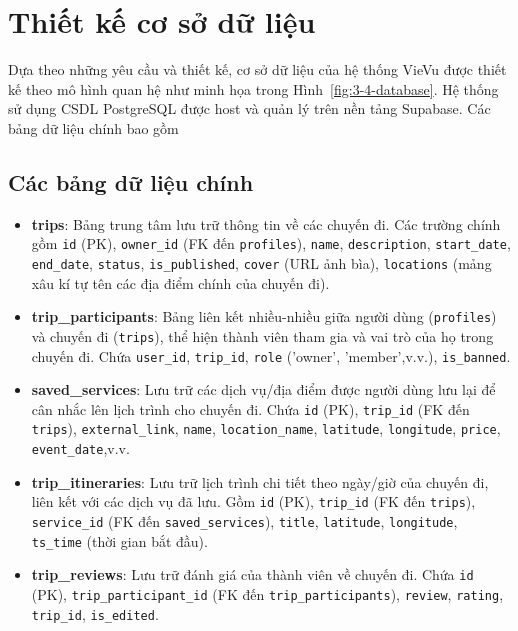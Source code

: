 \section{Thiết kế cơ sở dữ liệu}
\label{sec:3-4-database}


Dựa theo những yêu cầu và thiết kế, cơ sở dữ liệu của hệ thống VieVu được thiết kế theo mô hình quan hệ như minh họa trong Hình~\ref{fig:3-4-database}. %
Hệ thống sử dụng CSDL PostgreSQL được host và quản lý trên nền tảng Supabase. Các bảng dữ liệu chính bao gồm
\subsection{Các bảng dữ liệu chính}
\begin{itemize}
    \item \textbf{trips}: Bảng trung tâm lưu trữ thông tin về các chuyến đi. Các trường chính gồm \texttt{id} (PK), \texttt{owner\_id} (FK đến \texttt{profiles}), \texttt{name}, \texttt{description}, \texttt{start\_date}, \texttt{end\_date}, \texttt{status}, \texttt{is\_published}, \texttt{cover} (URL ảnh bìa), \texttt{locations} (mảng xâu kí tự tên các địa điểm chính của chuyến đi).

    \item \textbf{trip\_participants}: Bảng liên kết nhiều-nhiều giữa người dùng (\texttt{profiles}) và chuyến đi (\texttt{trips}), thể hiện thành viên tham gia và vai trò của họ trong chuyến đi. Chứa \texttt{user\_id}, \texttt{trip\_id}, \texttt{role} ('owner', 'member',v.v.), \texttt{is\_banned}.

    \item \textbf{saved\_services}: Lưu trữ các dịch vụ/địa điểm được người dùng lưu lại để cân nhắc lên lịch trình cho chuyến đi. Chứa \texttt{id} (PK), \texttt{trip\_id} (FK đến \texttt{trips}), \texttt{external\_link}, \texttt{name}, \texttt{location\_name}, \texttt{latitude}, \texttt{longitude}, \texttt{price}, \texttt{event\_date},v.v.

    \item \textbf{trip\_itineraries}: Lưu trữ lịch trình chi tiết theo ngày/giờ của chuyến đi, liên kết với các dịch vụ đã lưu. Gồm \texttt{id} (PK), \texttt{trip\_id} (FK đến \texttt{trips}), \texttt{service\_id} (FK đến \texttt{saved\_services}), \texttt{title}, \texttt{latitude}, \texttt{longitude}, \texttt{ts\_time} (thời gian bắt đầu).

    \item \textbf{trip\_reviews}: Lưu trữ đánh giá của thành viên về chuyến đi. Chứa \texttt{id} (PK), \texttt{trip\_participant\_id} (FK đến \texttt{trip\_participants}), \texttt{review}, \texttt{rating}, \texttt{trip\_id}, \texttt{is\_edited}.
    

\end{itemize}
